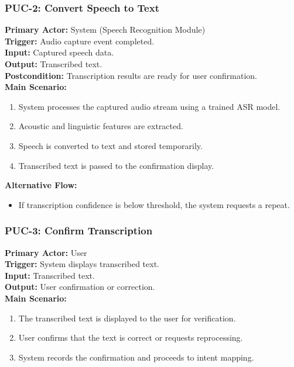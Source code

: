 \documentclass[12pt]{article}
\begin{document}
\bigskip

\subsubsection*{PUC-2: Convert Speech to Text}
\textbf{Primary Actor:} System (Speech Recognition Module) \\
\textbf{Trigger:} Audio capture event completed. \\
\textbf{Input:} Captured speech data. \\
\textbf{Output:} Transcribed text. \\
\textbf{Postcondition:} Transcription results are ready for user confirmation. \\

\textbf{Main Scenario:}
\begin{enumerate}
  \item System processes the captured audio stream using a trained ASR model.
  \item Acoustic and linguistic features are extracted.
  \item Speech is converted to text and stored temporarily.
  \item Transcribed text is passed to the confirmation display.
\end{enumerate}

\textbf{Alternative Flow:}
\begin{itemize}
  \item If transcription confidence is below threshold, the system requests a repeat.
\end{itemize}

\bigskip

\subsubsection*{PUC-3: Confirm Transcription}
\textbf{Primary Actor:} User \\
\textbf{Trigger:} System displays transcribed text. \\
\textbf{Input:} Transcribed text. \\
\textbf{Output:} User confirmation or correction. \\

\textbf{Main Scenario:}
\begin{enumerate}
  \item The transcribed text is displayed to the user for verification.
  \item User confirms that the text is correct or requests reprocessing.
  \item System records the confirmation and proceeds to intent mapping.
\end{enumerate}
\end{document}

